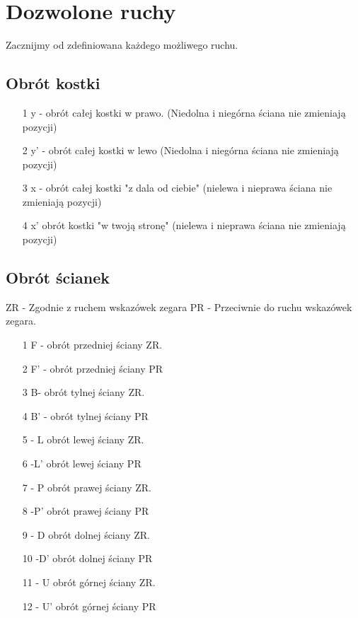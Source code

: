 \documentclass{article}
\begin{document}
\section{Dozwolone ruchy}
Zacznijmy od zdefiniowana każdego możliwego ruchu.

\subsection{Obrót kostki}
\begin{enumerate}
\item[1] y - obrót całej kostki w prawo. (Niedolna i niegórna ściana nie zmieniają pozycji)
\item[2] y' - obrót całej kostki w lewo (Niedolna i niegórna ściana nie zmieniają pozycji)
\item[3] x - obrót całej kostki "z dala od ciebie" (nielewa i nieprawa ściana nie zmieniają pozycji)
\item[4] x' obrót kostki "w twoją stronę" (nielewa i nieprawa ściana nie zmieniają pozycji)
\end{enumerate}

\subsection{Obrót ścianek}
ZR - Zgodnie z ruchem wskazówek zegara
PR - Przeciwnie do ruchu wskazówek zegara.

\begin{enumerate}
\item[1] F -  obrót przedniej ściany ZR.
\item[2] F' - obrót przedniej ściany PR 
\item[3] B-  obrót tylnej ściany ZR.
\item[4] B' - obrót tylnej ściany PR  
\item[5] - L  obrót lewej ściany ZR.
\item[6] -L' obrót lewej ściany PR 
\item[7] - P  obrót prawej ściany ZR.
\item[8] -P' obrót prawej ściany PR 
\item[9] - D  obrót dolnej ściany ZR.
\item[10] -D' obrót dolnej ściany PR 
\item[11] - U  obrót górnej ściany ZR.
\item[12] - U' obrót górnej ściany PR 

\end{enumerate}
\end{document}
